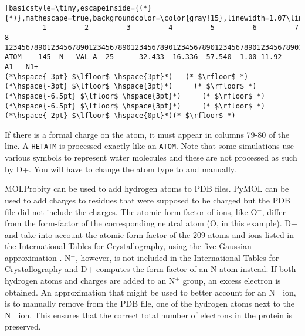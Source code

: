 \documentclass[../D+Manual.tex]{subfiles}
\begin{document}
\begin{lstlisting}[basicstyle=\tiny,escapeinside={(*}{*)},mathescape=true,backgroundcolor=\color{gray!15},linewidth=1.07\linewidth]
         1         2         3         4         5         6         7         8
12345678901234567890123456789012345678901234567890123456789012345678901234567890
ATOM    145  N   VAL A  25      32.433  16.336  57.540  1.00 11.92      A1   N1+
(*\hspace{-3pt} $\lfloor$ \hspace{3pt}*)   (* $\rfloor$ *)                       (*\hspace{-3pt} $\lfloor$ \hspace{3pt}*)     (* $\rfloor$ *)(*\hspace{-6.5pt} $\lfloor$ \hspace{3pt}*)     (* $\rfloor$ *)(*\hspace{-6.5pt} $\lfloor$ \hspace{3pt}*)     (* $\rfloor$ *)                     (*\hspace{-2pt} $\lfloor$ \hspace{0pt}*)(* $\rfloor$ *)
\end{lstlisting}


If there is a formal charge on the atom, it must appear in columns 79-80 of the line. A \texttt{HETATM} is processed exactly like an \texttt{ATOM}. Note that some simulations use various symbols to represent water molecules and these are not processed as such by D+. You will have to change the atom type to  and  manually.

MOLProbity \cite{ChenDz5180} can be used to add hydrogen atoms to PDB files. PyMOL \cite{PyMOL} can be used to add charges to residues that were supposed to be charged but the PDB file did not include the charges. The atomic form factor of ions, like O$^-$, differ from the form-factor of the corresponding neutral atom (O, in this example). D+ and take into account the atomic form factor of the 209 atoms and ions listed in the International Tables for Crystallography, using the five-Gaussian approximation \cite{hamilton1974international,marsh1983corrections}.    N$^+$, however, is not included in the International Tables for Crystallography and D+ computes the form factor of an N atom instead. If both  hydrogen atoms and charges are added to an N$^+$ group, an excess electron is obtained. An approximation that might be used to better account for an N$^+$ ion, is to manually remove from the PDB file, one of the hydrogen atoms next to the N$^+$ ion. This ensures that the correct total number of electrons in the protein is preserved. 
\end{document}
